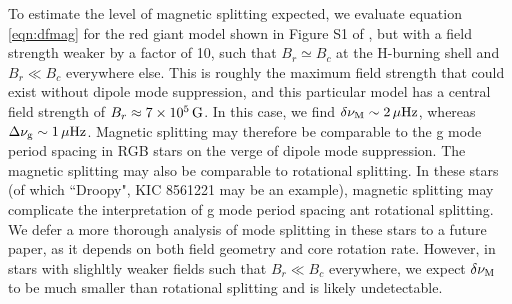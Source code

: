To estimate the level of magnetic splitting expected, we evaluate equation \ref{eqn:dfmag} for the red giant model shown in Figure S1 of \cite{Fuller_2015}, but with a field strength weaker by a factor of 10, such that $B_r \simeq B_c$ at the H-burning shell and $B_r \ll B_c$ everywhere else. This is roughly the maximum field strength that could exist without dipole mode suppression, and this particular model has a central field strength of $B_r \approx 7 \times 10^5 \, {\rm G}$.  In this case, we find $\delta \nu_{\rm M} \sim 2 \, \mu {\rm Hz}$, whereas $\Delta \nu_{\rm g} \sim 1 \, \mu{\rm Hz}$. Magnetic splitting may therefore be comparable to the g mode period spacing in RGB stars on the verge of dipole mode suppression. The magnetic splitting may also be comparable to rotational splitting. In these stars (of which ``Droopy", KIC 8561221 \cite{Garcia_2014} may be an example), magnetic splitting may complicate the interpretation of g mode period spacing ant rotational splitting. We defer a more thorough analysis of mode splitting in these stars to a future paper, as it depends on both field geometry and core rotation rate. However, in stars with slighltly weaker fields such that $B_r \ll B_c$ everywhere, we expect $\delta \nu_{\rm M}$ to be much smaller than rotational splitting and is likely undetectable. 




